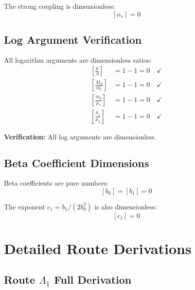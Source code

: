 \documentclass[11pt,a4paper]{article}
\theoremstyle{definition}
\begin{document}
The strong coupling is dimensionless:
\begin{equation}
\label{eq:dim-alpha}
[\alpha_s] = 0
\end{equation}

\subsection{Log Argument Verification}
\label{subsec:log-verify}

All logarithm arguments are dimensionless ratios:
\begin{align}
\label{eq:log-arg-verify-1}
\left[\frac{\mu}{\Lambda}\right] &= 1 - 1 = 0 \quad \checkmark \\
\label{eq:log-arg-verify-2}
\left[\frac{M_Z}{m_t}\right] &= 1 - 1 = 0 \quad \checkmark \\
\label{eq:log-arg-verify-3}
\left[\frac{m_q}{\mu_*}\right] &= 1 - 1 = 0 \quad \checkmark \\
\label{eq:log-arg-verify-4}
\left[\frac{\mu_1}{\mu_2}\right] &= 1 - 1 = 0 \quad \checkmark
\end{align}

\textbf{Verification:} All log arguments are dimensionless.

\subsection{Beta Coefficient Dimensions}
\label{subsec:beta-dims}

Beta coefficients are pure numbers:
\begin{equation}
\label{eq:dim-beta}
[b_0] = [b_1] = 0
\end{equation}

The exponent $c_1 = b_1/(2b_0^2)$ is also dimensionless:
\begin{equation}
\label{eq:dim-c1}
[c_1] = 0
\end{equation}

\appendix
\section{Detailed Route Derivations}
\label{app:route-derivations}

\subsection{Route $\Lambda_1$ Full Derivation}
\label{subsec:lambda1-full}
\end{document}
